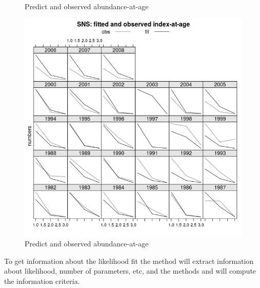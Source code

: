 \documentclass[a4paper,english,10pt]{article}\usepackage[]{graphicx}\usepackage[]{color}
\newenvironment{knitrout}{}{} %
\begin{document}
\begin{knitrout}
\begin{figure}[H]
{}

\caption[Predict and observed abundance-at-age]{Predict and observed abundance-at-age}\label{fig:idxplt2}
\end{figure}

\begin{figure}[H]

{\centering \includegraphics[width=.9\linewidth]{figure/idxplt-3} 

}

\caption[Predict and observed abundance-at-age]{Predict and observed abundance-at-age}\label{fig:idxplt3}
\end{figure}


\end{knitrout}



To get information about the likelihood fit the method  will extract information about likelihood, number of parameters, etc, and the methods  and  will compute the information criteria.
\end{document}
